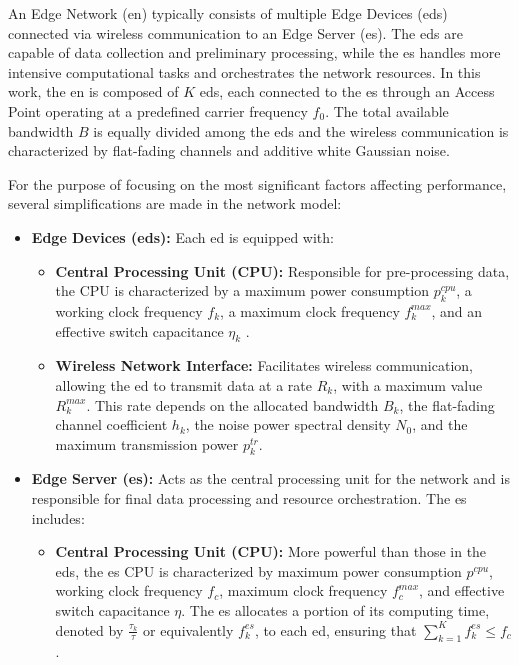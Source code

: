 An Edge Network (\gls{en}) typically consists of multiple Edge Devices (\glspl{ed}) connected via wireless communication to an Edge Server (\gls{es}). The \glspl{ed} are capable of data collection and preliminary processing, while the \gls{es} handles more intensive computational tasks and orchestrates the network resources. In this work, the \gls{en} is composed of $K$ \glspl{ed}, each connected to the \gls{es} through an Access Point operating at a predefined carrier frequency $f_0$. The total available bandwidth $B$ is equally divided among the \glspl{ed} and the wireless communication is characterized by flat-fading channels and additive white Gaussian noise.

For the purpose of focusing on the most significant factors affecting performance, several simplifications are made in the network model:

\begin{itemize} \item \textbf{Edge Devices (\glspl{ed}):} Each \gls{ed} is equipped with: \begin{itemize} \item \textbf{Central Processing Unit (CPU):} Responsible for pre-processing data, the CPU is characterized by a maximum power consumption $p_k^{cpu}$, a working clock frequency $f_k$, a maximum clock frequency $f_k^{max}$, and an effective switch capacitance $\eta_k$ \cite{Burd1996EffSwithc}. \item \textbf{Wireless Network Interface:} Facilitates wireless communication, allowing the \gls{ed} to transmit data at a rate $R_k$, with a maximum value $R_k^{max}$. This rate depends on the allocated bandwidth $B_k$, the flat-fading channel coefficient $h_k$, the noise power spectral density $N_0$, and the maximum transmission power $p_k^{tr}$. \end{itemize} \item \textbf{Edge Server (\gls{es}):} Acts as the central processing unit for the network and is responsible for final data processing and resource orchestration. The \gls{es} includes: \begin{itemize} \item \textbf{Central Processing Unit (CPU):} More powerful than those in the \glspl{ed}, the \gls{es} CPU is characterized by maximum power consumption $p^{cpu}$, working clock frequency $f_c$, maximum clock frequency $f_c^{max}$, and effective switch capacitance $\eta$. The \gls{es} allocates a portion of its computing time, denoted by $\frac{\tau_k}{\tau}$ or equivalently $f_k^{es}$, to each \gls{ed}, ensuring that $\sum_{k=1}^K f_k^{es} \leq f_c$. \end{itemize} \end{itemize}

